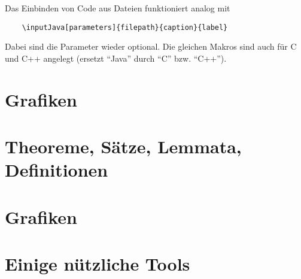 	Das Einbinden von Code aus Dateien funktioniert analog mit 
	\begin{verbatim}
	\inputJava[parameters]{filepath}{caption}{label}
	\end{verbatim}
	Dabei sind die Parameter wieder optional. Die gleichen Makros sind auch für C und C++ angelegt (ersetzt \enquote{Java} durch \enquote{C} bzw. \enquote{C++}). 

\section{Grafiken}

\section{Theoreme, Sätze, Lemmata, Definitionen}

\section{Grafiken}

\section{Einige nützliche Tools}